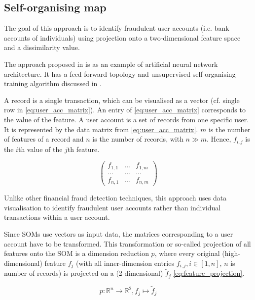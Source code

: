 \subsection{Self-organising map}
The goal of this approach is to identify fraudulent user accounts (i.e. bank accounts of individuals) using projection onto a two-dimensional feature space and a dissimilarity value.

The approach proposed in \cite{fd_SOM} is  as an example of artificial neural network architecture.
It has a feed-forward topology and unsupervised self-organising training algorithm discussed in \cite{credit_f_SOM}.

A record is a single transaction, which can be visualised as a vector (cf. single row in \eqref{eq:user_acc_matrix}). An entry of \eqref{eq:user_acc_matrix} corresponds to the value of the feature.
A user account is a set of records from one specific user. 
It is represented by the data matrix from \eqref{eq:user_acc_matrix}. 
$m$ is the number of features of a record and $n$ is the number of records, with $n \gg m$. 
Hence, $f_{i,j}$ is the $i$th value of the $j$th feature.
%
\begin{ceqn}
    \begin{equation}
    \label{eq:user_acc_matrix}
        \begin{pmatrix}
            f_{1,1} & ... & f_{1,m}\\
            ... & ... & ... \\
            f_{n,1} & ... & f_{n,m}
        \end{pmatrix}
    \end{equation}
\end{ceqn}
%
Unlike other financial fraud detection techniques, this approach uses data visualisation to identify fraudulent user accounts rather than individual transactions within a user account.

Since \acp{SOM} use vectors as input data, the matrices corresponding to a user account have to be transformed. This transformation or so-called projection of all features onto the \ac{SOM} is a dimension reduction $p$, where every original (high-dimensional) feature $f_j$ (with all inner-dimension entries $f_{i,j}, i \in [1, n]$, $n$ is number of records) is projected on a (2-dimensional) $\tilde f_j$ \eqref{eq:feature_projection}.
%
\begin{ceqn}
    \begin{equation}
    \label{eq:feature_projection}
        p: \mathbb{R}^n \to \mathbb{R}^2, f_j \mapsto \tilde f_j
    \end{equation}
\end{ceqn}


